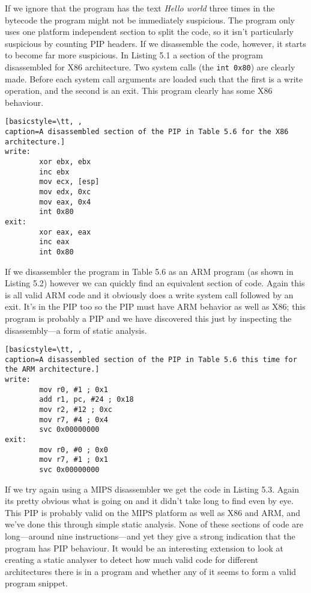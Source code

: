 \documentclass[10pt,]{book}
\begin{document}
If we ignore that the program has the text \emph{Hello world} three
times in the bytecode the program might not be immediately suspicious.
The program only uses one platform independent section to split the
code, so it isn't particularly suspicious by counting PIP headers. If we
disassemble the code, however, it starts to become far more suspicious.
In Listing 5.1 a section of the program disassembled for X86
architecture. Two system calls (the \lstinline!int 0x80!) are clearly
made\autocite{Kerrisk:vo}. Before each system call arguments are loaded
such that the first is a write operation, and the second is an exit.
This program clearly has some X86 behaviour.

\begin{lstlisting}[basicstyle=\tt, ,
caption=A disassembled section of the PIP in Table 5.6 for the X86 architecture.]
write:
        xor ebx, ebx
        inc ebx
        mov ecx, [esp]
        mov edx, 0xc
        mov eax, 0x4
        int 0x80
exit:
        xor eax, eax
        inc eax
        int 0x80
\end{lstlisting}
If we disassembler the program in Table 5.6 as an ARM program (as shown
in Listing 5.2) however we can quickly find an equivalent section of
code. Again this is all valid ARM code and it obviously does a write
system call followed by an exit. It's in the PIP too so the PIP must
have ARM behavior as well as X86; this program is probably a PIP and we
have discovered this just by inspecting the disassembly---a form of
static analysis.

\begin{lstlisting}[basicstyle=\tt, ,
caption=A disassembled section of the PIP in Table 5.6 this time for the ARM architecture.]
write:
        mov r0, #1 ; 0x1
        add r1, pc, #24 ; 0x18
        mov r2, #12 ; 0xc
        mov r7, #4 ; 0x4
        svc 0x00000000
exit:
        mov r0, #0 ; 0x0
        mov r7, #1 ; 0x1
        svc 0x00000000
\end{lstlisting}
If we try again using a MIPS disassembler we get the code in Listing
5.3. Again its pretty obvious what is going on and it didn't take long
to find even by eye. This PIP is probably valid on the MIPS platform as
well as X86 and ARM, and we've done this through simple static analysis.
None of these sections of code are long---around nine instructions---and
yet they give a strong indication that the program has PIP behaviour. It
would be an interesting extension to look at creating a static analyser
to detect how much valid code for different architectures there is in a
program and whether any of it seems to form a valid program snippet.
\end{document}
